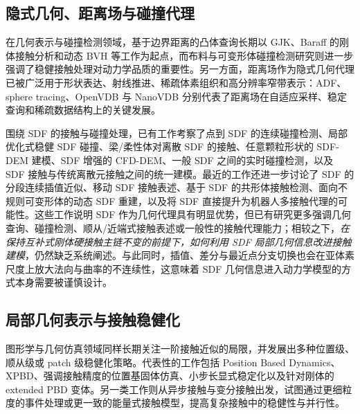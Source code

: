 \subsection{隐式几何、距离场与碰撞代理}
在几何表示与碰撞检测领域，基于边界距离的凸体查询长期以 GJK、Baraff 的刚体接触分析和动态 BVH 等工作为起点，而布料与可变形体碰撞检测研究则进一步强调了稳健接触处理对动力学品质的重要性\cite{gilbert1988fast,baraff1989analytical,baraff1994fast,larsson2006dbvh,bridson2002robust,teschner2005collision,wang2021collision}。另一方面，距离场作为隐式几何代理已被广泛用于形状表达、射线推进、稀疏体素组织和高分辨率窄带表示：ADF、sphere tracing、OpenVDB 与 NanoVDB 分别代表了距离场在自适应采样、稳定查询和稀疏数据结构上的关键发展\cite{frisken2000adf,hart1996sphere,museth2013vdb,museth2021nanovdb}。

围绕 SDF 的接触与碰撞处理，已有工作考察了点到 SDF 的连续碰撞检测、局部优化式稳健 SDF 碰撞、梁/柔性体对离散 SDF 的接触、任意颗粒形状的 SDF-DEM 建模、SDF 增强的 CFD-DEM、一般 SDF 之间的实时碰撞检测，以及 SDF 接触与传统离散元接触之间的统一建模\cite{hapticsdf2017,macklin2020sdfcollision,sdfbeam2020,sdfdem2022,sdfcfddem2023,liu2024sdfsdf,lai2024unifying,lopez2024convexsdf}。最近的工作还进一步讨论了 SDF 的分段连续插值近似、移动 SDF 接触表述、基于 SDF 的共形体接触检测、面向不规则可变形体的动态 SDF 重建，以及将 SDF 直接提升为机器人多接触代理的可能性\cite{adaptivesdf2023,movingframesdf2024,superellipsecontact2025,dynamicreconsdf2025,contactsdf2025}。这些工作说明 SDF 作为几何代理具有明显优势，但已有研究更多强调几何查询、碰撞检测、顺从/近端式接触表述或一般性的接触代理能力；相较之下，\emph{在保持互补式刚体硬接触主链不变的前提下，如何利用 SDF 局部几何信息改进接触建模}，仍然缺乏系统阐述。与此同时，插值、差分与最近点分支切换也会在亚体素尺度上放大法向与曲率的不连续性，这意味着 SDF 几何信息进入动力学模型的方式本身需要被谨慎设计。

\subsection{局部几何表示与接触稳健化}
图形学与几何仿真领域同样长期关注一阶接触近似的局限，并发展出多种位置级、顺从级或 patch 级稳健化策略。代表性的工作包括 Position Based Dynamics、XPBD、强调接触精度的位置基固体仿真、小步长显式稳定化以及针对刚体的 extended PBD 变体\cite{muller2007pbd,macklin2016xpbd,francu2017solids,macklin2019smallsteps,xpbdrigidbody2020}。另一类工作则从异步接触与变分接触出发，试图通过更细粒度的事件处理或更一致的能量式接触模型，提高复杂接触中的稳健性与并行性\cite{harmon2009acm,vouga2011avcm,ainsley2012spacm}。

